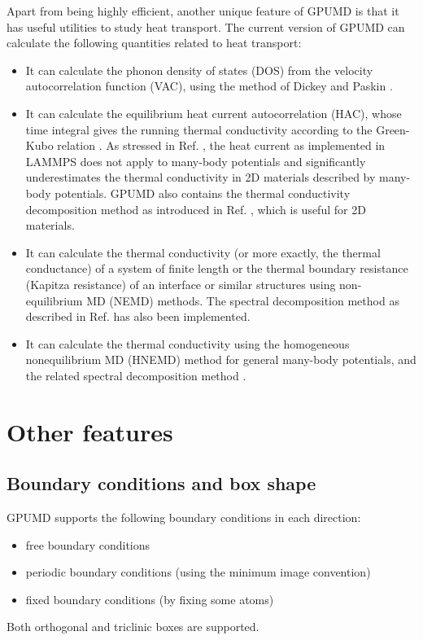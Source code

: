\documentclass[12pt,a4paper]{report}
\begin{document}
Apart from being highly efficient, another unique feature of GPUMD is that it has useful utilities to study heat transport. The current version of GPUMD can calculate the following quantities related to heat transport:
\begin{itemize}
\item It can calculate the phonon density of states (DOS) from the velocity autocorrelation function (VAC), using the method of Dickey and Paskin \cite{dickey1969pr}.
\item It can calculate the equilibrium heat current autocorrelation (HAC), whose time integral gives the running thermal conductivity according to the Green-Kubo relation \cite{green1954jcp,kubo1957jpsj}. As stressed in Ref. \cite{fan2015prb}, the heat current as implemented in LAMMPS \cite{plimpton1995jcp} does not apply to many-body potentials and significantly underestimates the thermal conductivity in 2D materials described by many-body potentials. GPUMD also contains the thermal conductivity decomposition method as introduced in Ref. \cite{fan2017prb}, which is useful for 2D materials.
\item It can calculate the thermal conductivity (or more exactly, the thermal conductance) of a system of finite length or the thermal boundary resistance (Kapitza resistance) of an interface or similar structures using non-equilibrium MD (NEMD) methods. The spectral decomposition method as described in Ref. \cite{fan2017prb} has also been implemented.
\item It can calculate the thermal conductivity using the homogeneous nonequilibrium MD (HNEMD) method \cite{evans1982pla} for general many-body potentials, and the related spectral decomposition method \cite{fan2018submitted}.
\end{itemize}

\section{Other features}

\subsection{Boundary conditions and box shape}

GPUMD supports the following boundary conditions in each direction:
  \begin{itemize}
  \item free boundary conditions
  \item periodic boundary conditions (using the minimum image convention)
  \item fixed boundary conditions (by fixing some atoms)
  \end{itemize}
Both orthogonal and triclinic boxes are supported.
\end{document}
